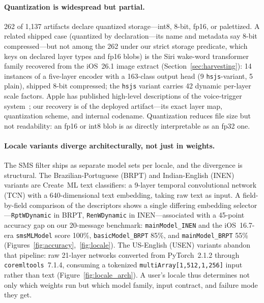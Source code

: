 \documentclass[letterpaper,twocolumn,10pt]{article}
\newcommand{\coremltools}{\texttt{coremltools}\xspace}
\begin{document}
\paragraph{Quantization is widespread but partial.}
262 of 1{,}137 artifacts declare quantized storage---int8, 8-bit, fp16, or
palettized. A related shipped case (quantized by declaration---its name
and metadata say 8-bit compressed---but not among the 262 under our strict
storage predicate, which keys on declared layer types and fp16 blobs) is
the Siri wake-word transformer family recovered from the iOS~26.1 image
extract (Section~\ref{sec:harvesting}): 14 instances of a five-layer
encoder with a 163-class output head (9 \texttt{hsjs}-variant, 5 plain),
shipped 8-bit compressed; the \texttt{hsjs} variant carries 42 dynamic
per-layer scale factors. Apple
has published high-level descriptions of the voice-trigger
system~\cite{siri_voice_trigger}; our recovery is of the deployed
artifact---its exact layer map, quantization scheme, and internal codename.
Quantization reduces file size but not readability: an fp16 or int8 blob is
as directly interpretable as an fp32 one.

\paragraph{Locale variants diverge architecturally, not just in weights.}
The SMS filter ships as separate model sets per locale, and the divergence
is structural.
The Brazilian-Portuguese (BRPT) and Indian-English (INEN) variants are
Create~ML text classifiers: a 9-layer temporal convolutional network (TCN)
with a 640-dimensional text embedding, taking raw text as input.
A field-by-field comparison of the descriptors shows a single differing
embedding selector---\texttt{RptWDynamic} in BRPT, \texttt{RenWDynamic} in
INEN---associated with a 45-point accuracy gap on our 20-message benchmark:
\texttt{mainModel\_}\allowbreak\texttt{INEN} and the iOS~16.7-era \texttt{smsMLModel} score 100\%,
\texttt{basicModel\_}\allowbreak\texttt{BRPT} 85\%, and \texttt{mainModel\_}\allowbreak\texttt{BRPT} 55\%
(Figures~\ref{fig:accuracy},~\ref{fig:locale}).
The US-English (USEN) variants abandon that pipeline: raw 21-layer networks
converted from PyTorch~2.1.2 through \coremltools~7.1.4, consuming a
tokenized \texttt{multiArray[1,512,1,256]} input rather than text
(Figure~\ref{fig:locale_arch}).
A user's locale thus determines not only which weights run but which model
family, input contract, and failure mode they get.
\end{document}
